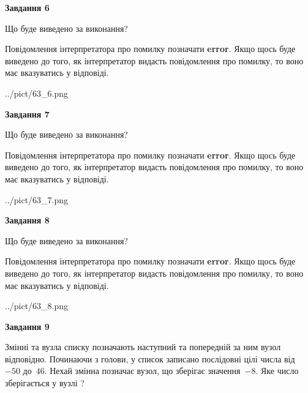 \documentclass[12pt, ukrainian]{article}
\begin{document}
{\begin {large}
{\begin {center}\textbf{Завдання 6}\end {center}}\par
Що буде виведено за виконання?

Повідомлення інтерпретатора про помилку позначати \textbf{error}.
Якщо щось буде виведено до того, як інтерпретатор видасть повідомлення про помилку, 
то воно має вказуватись у відповіді. \par


\begin{center}
	{../pict/63_6.png}
\end{center}
\newpage

{\begin {center}\textbf{Завдання 7}\end {center}}\par
Що буде виведено за виконання?

Повідомлення інтерпретатора про помилку позначати \textbf{error}.
Якщо щось буде виведено до того, як інтерпретатор видасть повідомлення про помилку, 
то воно має вказуватись у відповіді. \par


\begin{center}
	{../pict/63_7.png}
\end{center}
\newpage

{\begin {center}\textbf{Завдання 8}\end {center}}\par
Що буде виведено за виконання?

Повідомлення інтерпретатора про помилку позначати \textbf{error}.
Якщо щось буде виведено до того, як інтерпретатор видасть повідомлення про помилку, 
то воно має вказуватись у відповіді. \par


\begin{center}
	{../pict/63_8.png}
\end{center}
\newpage

{\begin {center}\textbf{Завдання 9}\end {center}}\par
Змінні  та  вузла списку позначають наступний та попередній за ним вузол відповідно. Починаючи з голови, у список записано послідовні цілі числа від~$-50$ до~$46$. Нехай змінна  позначає вузол, що зберігає значення~$-8$.
Яке число зберігається у вузлі  ?\par
\newpage


\end{large}}
\end{document}
